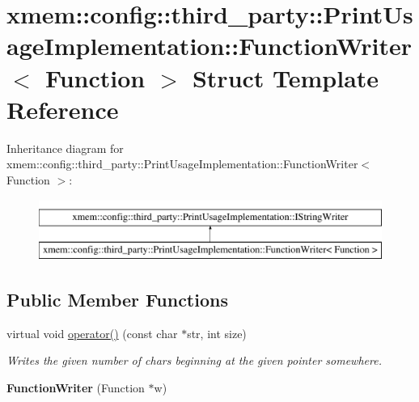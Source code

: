 \hypertarget{structxmem_1_1config_1_1third__party_1_1_print_usage_implementation_1_1_function_writer}{\section{xmem\-:\-:config\-:\-:third\-\_\-party\-:\-:Print\-Usage\-Implementation\-:\-:Function\-Writer$<$ Function $>$ Struct Template Reference}
\label{structxmem_1_1config_1_1third__party_1_1_print_usage_implementation_1_1_function_writer}
}
Inheritance diagram for xmem\-:\-:config\-:\-:third\-\_\-party\-:\-:Print\-Usage\-Implementation\-:\-:Function\-Writer$<$ Function $>$\-:\begin{figure}[H]
\begin{center}
\leavevmode
\includegraphics[height=2.000000cm]{structxmem_1_1config_1_1third__party_1_1_print_usage_implementation_1_1_function_writer}
\end{center}
\end{figure}
\subsection*{Public Member Functions}
\begin{DoxyCompactItemize}
\item 
\hypertarget{structxmem_1_1config_1_1third__party_1_1_print_usage_implementation_1_1_function_writer_abe1d90cb504d65f67564b73a4b49d9ee}{virtual void \hyperlink{structxmem_1_1config_1_1third__party_1_1_print_usage_implementation_1_1_function_writer_abe1d90cb504d65f67564b73a4b49d9ee}{operator()} (const char $\ast$str, int size)}\label{structxmem_1_1config_1_1third__party_1_1_print_usage_implementation_1_1_function_writer_abe1d90cb504d65f67564b73a4b49d9ee}

\begin{DoxyCompactList}\small\item\em Writes the given number of chars beginning at the given pointer somewhere. \end{DoxyCompactList}\item 
\hypertarget{structxmem_1_1config_1_1third__party_1_1_print_usage_implementation_1_1_function_writer_af078bf1e5f1545f343dd7111364c3936}{{\bfseries Function\-Writer} (Function $\ast$w)}\label{structxmem_1_1config_1_1third__party_1_1_print_usage_implementation_1_1_function_writer_af078bf1e5f1545f343dd7111364c3936}

\end{DoxyCompactItemize}
